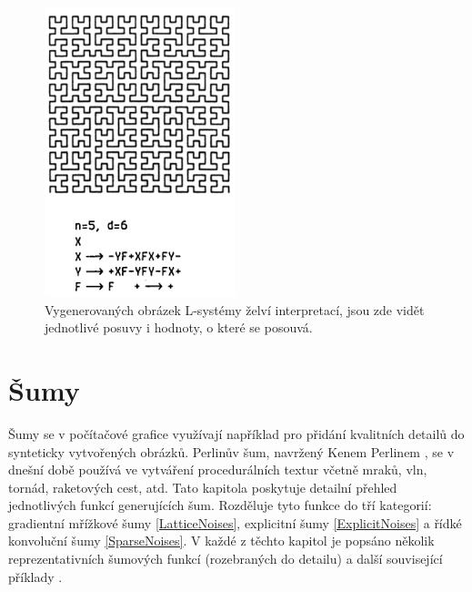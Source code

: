 \begin{figure}[H]
	\centering
	\includegraphics[scale=1]{obrazky-figures/L-system.png}
	\caption[L-system]{Vygenerovaných obrázek L-systémy želví interpretací, jsou zde vidět jednotlivé posuvy i hodnoty, o které se posouvá.}
\end{figure}
\newpage

\section{Šumy}
\label{noise}
Šumy se v počítačové grafice využívají například pro přidání kvalitních detailů do synteticky vytvořených obrázků. Perlinův šum, navržený Kenem Perlinem \cite{PerlinKen}, se v dnešní době používá ve vytváření procedurálních textur včetně mraků, vln, tornád, raketových cest, atd. Tato kapitola poskytuje detailní přehled jednotlivých funkcí generujících šum. Rozděluje tyto funkce do tří kategorií: gradientní mřížkové šumy \ref{LatticeNoises}, explicitní šumy \ref{ExplicitNoises} a řídké konvoluční šumy \ref{SparseNoises}. V každé z těchto kapitol je popsáno několik reprezentativních šumových funkcí (rozebraných do detailu) a další související příklady \cite{Lagae10}. 

